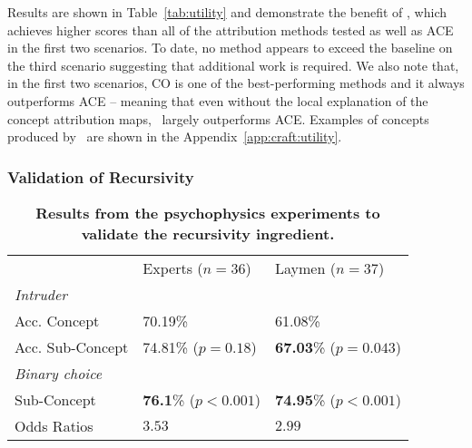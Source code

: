 Results are shown in Table~\ref{tab:utility} and demonstrate the benefit of \craft, which achieves higher scores than all of the attribution methods tested as well as ACE in the first two scenarios. To date, no method appears to exceed the baseline on the third scenario suggesting that additional work is required.
We also note that, in the first two scenarios, \craft CO is one of the best-performing methods and it always outperforms ACE -- meaning that even without the local explanation of the concept attribution maps, \craft~largely outperforms ACE. Examples of concepts produced by \craft~are shown in the Appendix~\ref{app:craft:utility}.


\subsubsection{Validation of Recursivity}
\label{sec:craft:expRecursivity}

\begin{table}
\centering
\begin{tabular}{lll}
\toprule
& Experts ($n=36$) & Laymen ($n=37$)\\
\cmidrule[0.1pt](lr){2-3}
\textit{Intruder}  \\
\cmidrule[0.1pt](lr){1-3}
Acc. Concept     & 70.19\%  & 61.08\%     \\
Acc. Sub-Concept & 74.81\% ($p = 0.18$)  & \textbf{67.03}\% ($p = 0.043$)      \\
\midrule
\textit{Binary choice} \\
\cmidrule[0.1pt](lr){1-3}
Sub-Concept & \textbf{76.1}\% ($p < 0.001$) & \textbf{74.95}\% ($p < 0.001$)\\
Odds Ratios & $3.53$ & $2.99$\\
\bottomrule
\end{tabular}
\caption{\textbf{Results from the psychophysics experiments to validate the recursivity ingredient. }}\label{tab:results}
\end{table}


